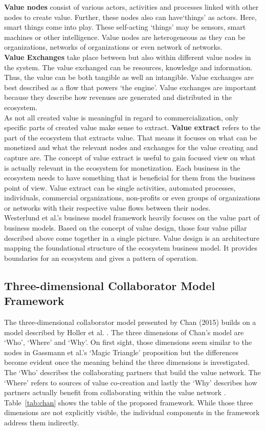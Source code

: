 		\textbf{Value nodes} consist of various actors, activities and processes linked with other nodes to create value. Further, these nodes also can have`things' as actors. Here, smart things come into play. These self-acting `things' may be sensors, smart machines or other intelligence. Value nodes are heterogeneous as they can be organizations, networks of organizations or even network of networks.\\
		\textbf{Value Exchanges} take place between but also within different value nodes in the system. The value exchanged can be resources, knowledge and information. Thus, the value can be both tangible as well an intangible. Value exchanges are best described as a flow that powers `the engine'. Value exchanges are important because they describe how revenues are generated and distributed in the ecosystem.\\
		As not all created value is meaningful in regard to commercialization, only specific parts of created value make sense to extract. \textbf{Value extract} refers to the part of the ecosystem that extracts value. That means it focuses on what can be monetized and what the relevant nodes and exchanges for the value creating and capture are. The concept of value extract is useful to gain focused view on what is actually relevant in the ecosystem for monetization. Each business in the ecosystem needs to have something that is beneficial for them from the business point of view. Value extract can be single activities, automated processes, individuals, commercial organizations, non-profits or even groups of organizations or networks with their respective value flows between their nodes.\\
		Westerlund et al.'s business model framework heavily focuses on the value part of business models. Based on the concept of value design, those four value pillar described above come together in a single picture. Value design is an architecture mapping the foundational structure of the ecosystem business model. It provides boundaries for an ecosystem and gives a pattern of operation.
	\vspace{-2em}
	\subsection{Three-dimensional Collaborator Model Framework}
	\vspace{-1em}	
		The three-dimensional collaborator model presented by Chan (2015) \cite{chan} builds on a model described by Holler et al. \cite{holler}. The three dimensions of Chan's model are `Who', `Where' and `Why'. On first sight, those dimensions seem similar to the nodes in Gassmann et al.'s `Magic Triangle' proposition but the differences become evident once the meaning behind the three dimensions is investigated. The `Who' describes the collaborating partners that build the value network. The `Where' refers to sources of value co-creation and lastly the `Why' describes how partners actually benefit from collaborating within the value network \cite{chan}. Table~\ref{tab:chan} shows the table of the proposed framework. While those three dimensions are not explicitly visible, the individual components in the framework address them indirectly.


